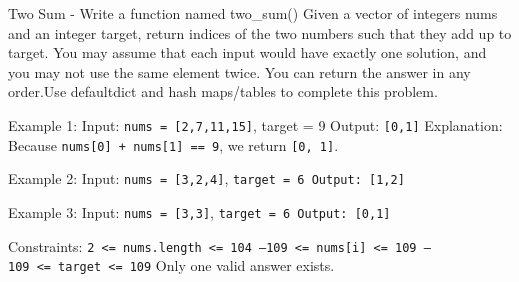 \documentclass[11pt]{article}
\begin{document}
Two Sum - Write a function named two\_sum() Given a vector of integers
nums and an integer target, return indices of the two numbers such that
they add up to target. You may assume that each input would have exactly
one solution, and you may not use the same element twice. You can return
the answer in any order.Use defaultdict and hash maps/tables to complete
this problem.

Example 1: Input: \texttt{nums\ =\ {[}2,7,11,15{]}}, target = 9 Output:
\texttt{{[}0,1{]}} Explanation: Because
\texttt{nums{[}0{]}\ +\ nums{[}1{]}\ ==\ 9}, we return
\texttt{{[}0,\ 1{]}}.

Example 2: Input: \texttt{nums\ =\ {[}3,2,4{]}},
\texttt{target\ =\ 6\ Output:\ {[}1,2{]}}

Example 3: Input: \texttt{nums\ =\ {[}3,3{]}},
\texttt{target\ =\ 6\ Output:\ {[}0,1{]}}

Constraints:
\texttt{2\ \textless{}=\ nums.length\ \textless{}=\ 104\ –109\ \textless{}=\ nums{[}i{]}\ \textless{}=\ 109\ –109\ \textless{}=\ target\ \textless{}=\ 109}
Only one valid answer exists.
\end{document}
